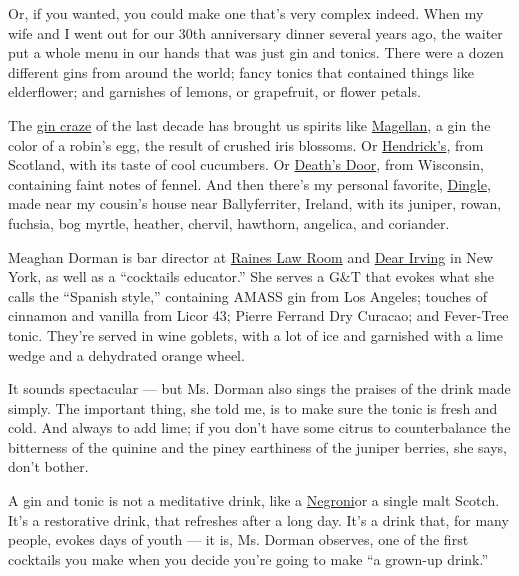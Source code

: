Or, if you wanted, you could make one that's very complex indeed. When
my wife and I went out for our 30th anniversary dinner several years
ago, the waiter put a whole menu in our hands that was just gin and
tonics. There were a dozen different gins from around the world; fancy
tonics that contained things like elderflower; and garnishes of lemons,
or grapefruit, or flower petals.

The
\href{https://www.barschool.net/us/blog/why-gin-so-popular-five-possible-theories}{gin
craze} of the last decade has brought us spirits like
\href{https://theginisin.com/gin-reviews/magellan-gin/}{Magellan}, a gin
the color of a robin's egg, the result of crushed iris blossoms. Or
\href{https://theginisin.com/gin-reviews/hendricks/}{Hendrick's}, from
Scotland, with its taste of cool cucumbers. Or
\href{https://www.ginfoundry.com/gin/deaths-door-gin/}{Death's Door},
from Wisconsin, containing faint notes of fennel. And then there's my
personal favorite,
\href{https://www.masterofmalt.com/gin/the-dingle-distillery/dingle-original-gin/}{Dingle},
made near my cousin's house near Ballyferriter, Ireland, with its
juniper, rowan, fuchsia, bog myrtle, heather, chervil, hawthorn,
angelica, and coriander.

Meaghan Dorman is bar director at
\href{http://www.raineslawroom.com/}{Raines Law Room} and
\href{https://www.dearirving.com/}{Dear Irving} in New York, as well as
a ``cocktails educator.'' She serves a G\&T that evokes what she calls
the ``Spanish style,'' containing AMASS gin from Los Angeles; touches of
cinnamon and vanilla from Licor 43; Pierre Ferrand Dry Curacao; and
Fever-Tree tonic. They're served in wine goblets, with a lot of ice and
garnished with a lime wedge and a dehydrated orange wheel.

It sounds spectacular --- but Ms. Dorman also sings the praises of the
drink made simply. The important thing, she told me, is to make sure the
tonic is fresh and cold. And always to add lime; if you don't have some
citrus to counterbalance the bitterness of the quinine and the piney
earthiness of the juniper berries, she says, don't bother.

A gin and tonic is not a meditative drink, like a
\href{https://www.nytimes.com/2019/06/12/opinion/negroni-2019.html}{Negroni}or
a single malt Scotch. It's a restorative drink, that refreshes after a
long day. It's a drink that, for many people, evokes days of youth ---
it is, Ms. Dorman observes, one of the first cocktails you make when you
decide you're going to make ``a grown-up drink.''


